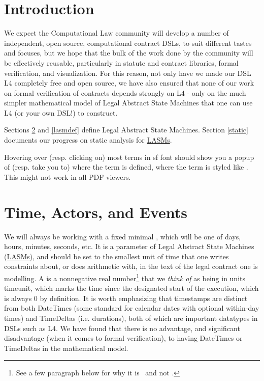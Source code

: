 \documentclass[12pt]{article}
\newcommand{\term}[1]{\EM{\textsf{\hyperref[#1]{#1}}}\xspace}
\newcommand{\lasm}{\term{LASM}}
\newcommand{\lasms}{{\sf \hyperref[LASM]{LASMs}}\xspace}
\newcommand{\TS}{\EM{\mathbb{\hyperref[TS]{T}}}}
\begin{document}
\section{Introduction}

We expect the Computational Law community will develop a number of independent, open source, computational contract DSLs, to suit different tastes and focuses, but we hope that the bulk of the work done by the community will be effectively reusable, particularly in statute and contract libraries, formal verification, and visualization. For this reason, not only have we made our DSL L4 completely free and open source, we have also ensured that none of our work on formal verification of contracts depends strongly on L4 - only on the much simpler mathematical model of Legal Abstract State Machines that one can use L4 (or your own DSL!) to construct.

Sections \ref{basics} and \ref{lasmdef} define Legal Abstract State Machines. Section \ref{static} documents our progress on static analysis for \lasms.

Hovering over (resp. clicking on) most terms in \textsf{{sf font}} should show you a popup of (resp. take you to)  where the term is defined, where the term is styled like . This might not work in all PDF viewers.


\section{Time, Actors, and Events} \label{basics}
We will always be working with a fixed minimal , which will be one of days, hours, minutes, seconds, etc. It is a parameter of Legal Abstract State Machines (\lasms), and should be set to the smallest unit of time that one writes constraints about, or does arithmetic with, in the text of the legal contract one is modelling.  A  is  a nonnegative real number\footnote{See a few paragraph below for why it is \RR\, and not \NN.} that we \textit{think of} as being in units timeunit, which marks the time since the designated start of the \lasm execution, which is always 0 by definition.
It is worth emphasizing that timestamps are distinct from both DateTimes (some standard for calendar dates with optional within-day times) and TimeDeltas (i.e. durations), both of which are important datatypes in DSLs such as L4. We have found that there is no advantage, and significant disadvantage (when it comes to formal verification), to having DateTimes or TimeDeltas in the mathematical model.
\end{document}
